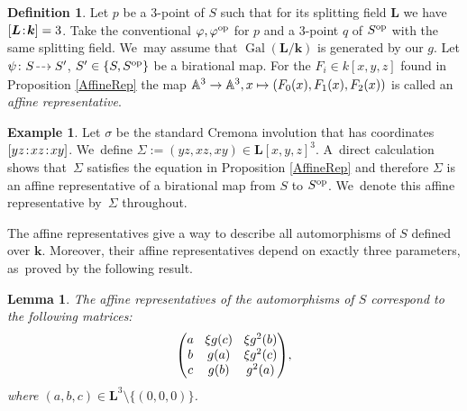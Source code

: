 \documentclass[JEP,XML,SOM,Unicode,NoFloatCountersInSection, NoEqCountersInSection,published]{cedram}
\newcommand{\dradpl}{{\hspace*{-2mm}\begin{tikzcd}[ampersand replacement=\&,column sep = scriptsize]\mbox{}\ar[r,dashed]\&\mbox{}\end{tikzcd}\hspace*{-2mm}}}
\newcommand{\dratst}{{\hspace*{-2.5mm}\begin{tikzcd}[ampersand replacement=\&,column sep = small]\mbox{}\ar[r,dashed]\&\mbox{}\end{tikzcd}\hspace*{-2mm}}}
\let\drascst\dratst
\newcommand{\dra}{\mathchoice{\dradpl}{\dratst}{\drascst}{\drascst}}
\newcommand\mto{\mathchoice{\longmapsto}{\mapsto}{\mapsto}{\mapsto}}
\newcommand{\op}{\textup{op}}
\newcommand{\sep}{\mkern2mu{:}\mkern2mu}
\DeclareMathOperator{\Gal}{Gal}
\newtheorem{lemma}[theorem]{Lemma}
\theoremstyle{definition}
\newtheorem{definition}[theorem]{Definition}
\newtheorem{example}[theorem]{Example}
\newcommand{\kk}{{\boldsymbol{k}}}
\newcommand{\LL}{{\boldsymbol{L}}}
\begin{document}
\begin{definition}
Let $p$ be a $3$\nobreakdash-point of $S$ such that for its splitting field $\LL$ we have $[\LL\sep \kk]=3$. Take the conventional $\varphi, \varphi^{\op}$ for $p$ and a $3$\nobreakdash-point $q$ of $S^{\op}$ with the same splitting field. We~may assume that $\Gal({\LL/\kk})$ is generated by our $g$. Let $\psi \colon S \dra S'$, $S' \in \{S,S^{\op}\}$ be a birational map. For the $F_i \in k[x,y,z]$ found in Proposition \ref{AffineRep} the map $\mathbb{A}^3 \to \mathbb{A}^3, x \mto (F_0(x),F_1(x),F_2(x))$ is called an \emph{affine representative}.
\end{definition}

\begin{example}
Let $\sigma$ be the standard Cremona involution that has coordinates \hbox{$[yz\sep xz\sep xy]$}. We~define $\Sigma := (yz, xz, xy) \in \LL[x,y,z]^3$. A~direct calculation shows that~$\Sigma$ satisfies the equation in Proposition \ref{AffineRep} and therefore $\Sigma$ is an affine representative of a birational map from $S$ to $S^{\op}$. We~denote this affine representative by~$\Sigma$ throughout.
\end{example}
The affine representatives give a way to describe all automorphisms of $S$ defined over $\kk$. Moreover, their affine representatives depend on exactly three parameters, as~proved by the following result.

\begin{lemma} \label{matrixL}
The affine representatives of the automorphisms of $S$ correspond to the following matrices:
\[\arraycolsep4.5pt
\begin{pmatrix}
a & \xi g(c) & \xi g^2(b) \\
b & g(a) & \xi g^2(c) \\
c & g(b) & g^2(a)
\end{pmatrix}\!,
\]
where $(a,b,c) \in \LL^3 \setminus \{ (0,0,0) \}$.
\end{lemma}
\end{document}
